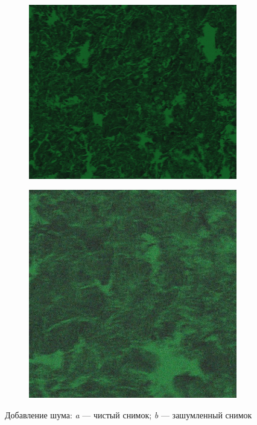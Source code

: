 \begin{figure}[!htbp]
	\begin{subfigure}[t]{0.45\linewidth}
			\centering
			\includegraphics[width=1.0\linewidth]{my_folder/images/clear.jpg}
			\caption{}
			\label{fig:clear}
		\end{subfigure}
	\hfill
	\begin{subfigure}[t]{0.45\linewidth}
			\centering
			\includegraphics[width=1.0\linewidth]{my_folder/images/noisy.jpg}
			\caption{}
			\label{fig:noisy}
		\end{subfigure}
	\caption{Добавление шума: {\itshape a} --- чистый снимок; {\itshape b} --- зашумленный снимок}
	\label{fig:noise_example}
\end{figure}

%
